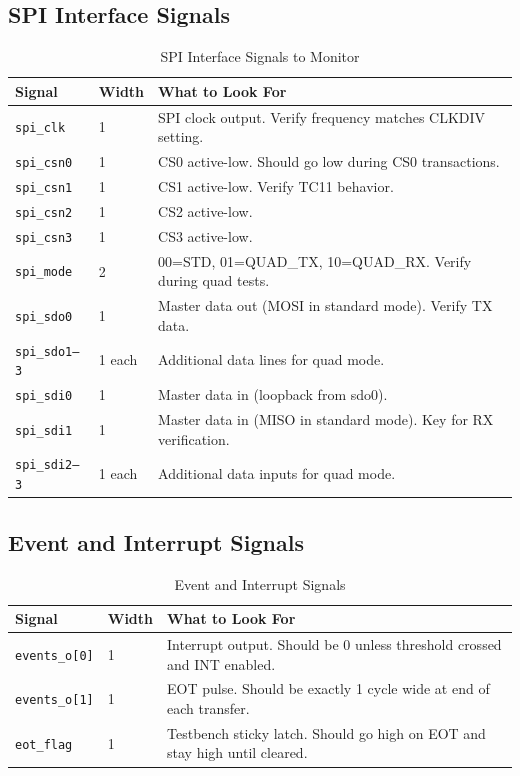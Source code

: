 \subsection{SPI Interface Signals}

\begin{table}[H]
\centering
\caption{SPI Interface Signals to Monitor}
\label{tab:spi_signals}
\begin{tabularx}{\textwidth}{@{}llX@{}}
\toprule
\textbf{Signal} & \textbf{Width} & \textbf{What to Look For} \\
\midrule
\texttt{spi\_clk}  & 1 & SPI clock output. Verify frequency matches CLKDIV setting. \\
\texttt{spi\_csn0} & 1 & CS0 active-low. Should go low during CS0 transactions. \\
\texttt{spi\_csn1} & 1 & CS1 active-low. Verify TC11 behavior. \\
\texttt{spi\_csn2} & 1 & CS2 active-low. \\
\texttt{spi\_csn3} & 1 & CS3 active-low. \\
\texttt{spi\_mode} & 2 & 00=STD, 01=QUAD\_TX, 10=QUAD\_RX. Verify during quad tests. \\
\texttt{spi\_sdo0} & 1 & Master data out (MOSI in standard mode). Verify TX data. \\
\texttt{spi\_sdo1--3} & 1 each & Additional data lines for quad mode. \\
\texttt{spi\_sdi0} & 1 & Master data in (loopback from sdo0). \\
\texttt{spi\_sdi1} & 1 & Master data in (MISO in standard mode). Key for RX verification. \\
\texttt{spi\_sdi2--3} & 1 each & Additional data inputs for quad mode. \\
\bottomrule
\end{tabularx}
\end{table}

\subsection{Event and Interrupt Signals}

\begin{table}[H]
\centering
\caption{Event and Interrupt Signals}
\label{tab:event_signals}
\begin{tabularx}{\textwidth}{@{}llX@{}}
\toprule
\textbf{Signal} & \textbf{Width} & \textbf{What to Look For} \\
\midrule
\texttt{events\_o[0]} & 1 & Interrupt output. Should be 0 unless threshold crossed and INT enabled. \\
\texttt{events\_o[1]} & 1 & EOT pulse. Should be exactly 1 cycle wide at end of each transfer. \\
\texttt{eot\_flag}     & 1 & Testbench sticky latch. Should go high on EOT and stay high until cleared. \\
\bottomrule
\end{tabularx}
\end{table}

